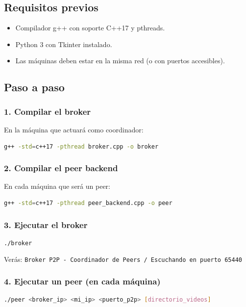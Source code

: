 \documentclass[12pt]{article}
\begin{document}
\subsection{Requisitos previos}
\begin{itemize}
    \item Compilador g++ con soporte C++17 y pthreads.
    \item Python 3 con Tkinter instalado.
    \item Las máquinas deben estar en la misma red (o con puertos accesibles).
\end{itemize}

\subsection{Paso a paso}

\subsubsection{1. Compilar el broker}
En la máquina que actuará como coordinador:
\begin{lstlisting}[language=bash]
g++ -std=c++17 -pthread broker.cpp -o broker
\end{lstlisting}

\subsubsection{2. Compilar el peer backend}
En cada máquina que será un peer:
\begin{lstlisting}[language=bash]
g++ -std=c++17 -pthread peer_backend.cpp -o peer
\end{lstlisting}

\subsubsection{3. Ejecutar el broker}
\begin{lstlisting}[language=bash]
./broker
\end{lstlisting}
Verás: \texttt{Broker P2P - Coordinador de Peers / Escuchando en puerto 65440}

\subsubsection{4. Ejecutar un peer (en cada máquina)}
\begin{lstlisting}[language=bash]
./peer <broker_ip> <mi_ip> <puerto_p2p> [directorio_videos]
\end{lstlisting}
\end{document}
